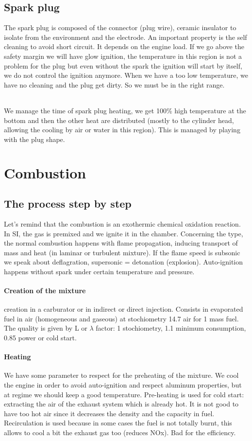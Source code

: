 \subsection{Spark plug}
	The spark plug is composed of the connector (plug wire), ceramic insulator to isolate from the environment and the electrode. An important property is the self cleaning to avoid short circuit. It depends on the engine load. If we go above the safety margin we will have glow ignition, the temperature in this region is not a problem for the plug but even without the spark the ignition will start by itself, we do not control the ignition anymore. When we have a too low temperature, we have no cleaning and the plug get dirty. So we must be in the right range. 
	
	\ \\
	We manage the time of spark plug heating, we get 100\% high temperature at the bottom and then the other heat are distributed (mostly to the cylinder head, allowing the cooling by air or water in this region). This is managed by playing with the plug shape. 
	
\section{Combustion}
\subsection{The process step by step}
	Let's remind that the combustion is an exothermic chemical oxidation reaction. In SI, the gas is premixed and we ignite it in the chamber. Concerning the type, the normal combustion happens with flame propagation, inducing transport of mass and heat (in laminar or turbulent mixture). If the flame speed is subsonic we speak about deflagration, supersonic = detonation (explosion). Auto-ignition happens without spark under certain temperature and pressure. 
	
\paragraph{Creation of the mixture}
	creation in a carburator or in indirect or direct injection. Consists in evaporated fuel in air (homogeneous and gaseous) at stochiometry 14.7 air for 1 mass fuel. The quality is given by L or $\lambda$ factor: 1 stochiometry, 1.1 minimum consumption, 0.85 power or cold start. 
	
\paragraph{Heating}
	We have some parameter to respect for the preheating of the mixture. We cool the engine in order to avoid auto-ignition and respect aluminum properties, but at regime we should keep a good temperature.  Pre-heating is used for cold start: extracting the air of the exhaust system which is already hot. It is not good to have too hot air since it decreases the density and the capacity in fuel. Recirculation is used because in some cases the fuel is not totally burnt, this allows to cool a bit the exhaust gas too (reduces NOx). Bad for the efficiency. 
	
